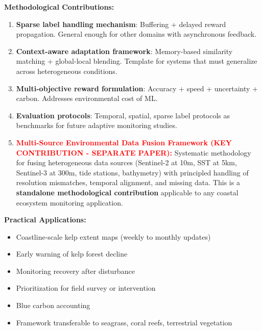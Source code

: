 \documentclass[11pt]{article}
\begin{document}
\textbf{Methodological Contributions:}
\begin{enumerate}
    \item \textbf{Sparse label handling mechanism}: Buffering + delayed reward propagation. General enough for other domains with asynchronous feedback.

    \item \textbf{Context-aware adaptation framework}: Memory-based similarity matching + global-local blending. Template for systems that must generalize across heterogeneous conditions.

    \item \textbf{Multi-objective reward formulation}: Accuracy + speed + uncertainty + carbon. Addresses environmental cost of ML.

    \item \textbf{Evaluation protocols}: Temporal, spatial, sparse label protocols as benchmarks for future adaptive monitoring studies.

    \item \textcolor{red}{\textbf{Multi-Source Environmental Data Fusion Framework (KEY CONTRIBUTION - SEPARATE PAPER):}} Systematic methodology for fusing heterogeneous data sources (Sentinel-2 at 10m, SST at 5km, Sentinel-3 at 300m, tide stations, bathymetry) with principled handling of resolution mismatches, temporal alignment, and missing data. This is a \textbf{standalone methodological contribution} applicable to any coastal ecosystem monitoring application.
\end{enumerate}

\textbf{Practical Applications:}
\begin{itemize}
    \item Coastline-scale kelp extent maps (weekly to monthly updates)
    \item Early warning of kelp forest decline
    \item Monitoring recovery after disturbance
    \item Prioritization for field survey or intervention
    \item Blue carbon accounting
    \item Framework transferable to seagrass, coral reefs, terrestrial vegetation
\end{itemize}
\end{document}
